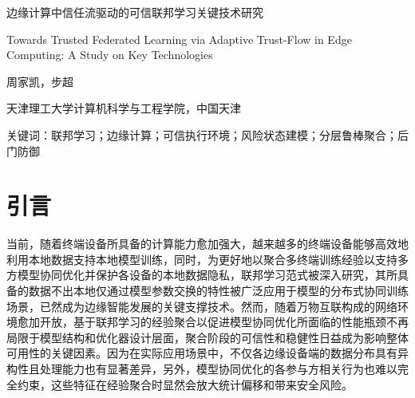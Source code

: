 \documentclass[11pt, a4paper, UTF8, fontset=fandol]{ctexart}
\begin{document}
\begin{center}
    {\Large 边缘计算中信任流驱动的可信联邦学习关键技术研究\par}
    \vspace{4pt}
    {\large Towards Trusted Federated Learning via Adaptive Trust-Flow in Edge Computing: A Study on Key Technologies\par}
    \vspace{10pt}
    {周家凯，步超\par}
    \vspace{2pt}
    {天津理工大学计算机科学与工程学院，中国天津\par}
\end{center}

\begin{abstract}
    近年来，联邦学习以其数据不出本地仅交换参数的范式促进隐私保护下的多方模型协同优化，已成为边缘智能的关键支撑。然而，在愈加开放的边缘计算场景中，非独立同分布（Non-IID）数据、终端设备异构化、不可信客户端等情形叠加，导致现有的鲁棒聚合方法面临着严峻挑战。由此，本文从软硬件协同角度提出一种基于全流程信任流的可信联邦聚合机制。首先，该机制融合基于可信执行环境（TEE）的远程证明和运行监测方法，以从本地模型训练阶段就约束参与客户端的强制准入与执行完整性验证；其次，通过刻画客户端的长期历史贡献和短期行为风险，设计了基于客户端信任状态的双流正交信誉演化方法，以分解客户端信任状态为历史效用流和瞬时风险流，解决潜伏攻击的跨轮识别挑战；最后，提出了基于纯净参考方向的分层差异化聚合方法，融合按层门控、重归一化和动态裁剪思想，以在聚合阶段抑制恶意更新并保留合法异构贡献，缓解 Non-IID 下泛化能力下降问题。基于 Flower 平台在 CIFAR-10 数据集上的 20 客户端、6 类混合攻击实验结果表明，本文机制在保证模型精度达到 $92.31\% (\pm 0.09\%)$ 的同时，将后门攻击成功率（ASR）控制在 $10.21\% (\pm 0.05\%)$，且正常客户端的永久误杀率趋近于 0。
\end{abstract}

关键词：联邦学习；边缘计算；可信执行环境；风险状态建模；分层鲁棒聚合；后门防御

\section{引言}
当前，随着终端设备所具备的计算能力愈加强大，越来越多的终端设备能够高效地利用本地数据支持本地模型训练，同时，为更好地以聚合多终端训练经验以支持多方模型协同优化并保护各设备的本地数据隐私，联邦学习范式被深入研究\cite{kairouz2021flsurvey}，其所具备的数据不出本地仅通过模型参数交换的特性被广泛应用于模型的分布式协同训练场景，已然成为边缘智能发展的关键支撑技术。然而，随着万物互联构成的网络环境愈加开放，基于联邦学习的经验聚合以促进模型协同优化所面临的性能瓶颈不再局限于模型结构和优化器设计层面，聚合阶段的可信性和稳健性日益成为影响整体可用性的关键因素。因为在实际应用场景中，不仅各边缘设备端的数据分布具有异构性且处理能力也有显著差异，另外，模型协同优化的各参与方相关行为也难以完全约束，这些特征在经验聚合时显然会放大统计偏移和带来安全风险。
\end{document}
